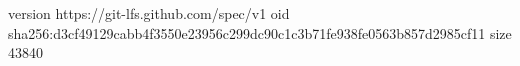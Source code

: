 version https://git-lfs.github.com/spec/v1
oid sha256:d3cf49129cabb4f3550e23956c299dc90c1c3b71fe938fe0563b857d2985cf11
size 43840
